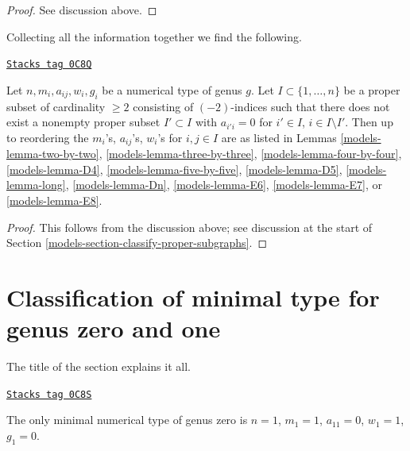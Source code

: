 \begin{proof}
See discussion above.
\end{proof}

Collecting all the information together we find the following.

\begin{proposition}
\label{models-proposition-classify-subgraphs}
\href{https://stacks.math.columbia.edu/tag/0C8Q}{\texttt{Stacks tag 0C8Q}}

Let $n, m_i, a_{ij}, w_i, g_i$ be a numerical type of genus $g$.
Let $I \subset \{1, \ldots, n\}$ be a proper subset of cardinality $\geq 2$
consisting of $(-2)$-indices such that there
does not exist a nonempty proper subset $I' \subset I$
with $a_{i'i} = 0$ for $i' \in I$, $i \in I \setminus I'$.
Then up to reordering the $m_i$'s, $a_{ij}$'s, $w_i$'s
for $i, j \in I$ are as listed in
Lemmas \ref{models-lemma-two-by-two},
\ref{models-lemma-three-by-three},
\ref{models-lemma-four-by-four},
\ref{models-lemma-D4},
\ref{models-lemma-five-by-five},
\ref{models-lemma-D5},
\ref{models-lemma-long},
\ref{models-lemma-Dn},
\ref{models-lemma-E6},
\ref{models-lemma-E7}, or
\ref{models-lemma-E8}.
\end{proposition}

\begin{proof}
This follows from the discussion above; see discussion at the
start of Section \ref{models-section-classify-proper-subgraphs}.
\end{proof}

\section{Classification of minimal type for genus zero and one}
\label{models-section-classification-genus-one}
The title of the section explains it all.

\begin{lemma}

\label{models-lemma-genus-zero}
\href{https://stacks.math.columbia.edu/tag/0C8S}{\texttt{Stacks tag 0C8S}}

The only minimal numerical type of genus zero is
$n = 1$, $m_1 = 1$, $a_{11} = 0$, $w_1 = 1$, $g_1 = 0$.
\end{lemma}

